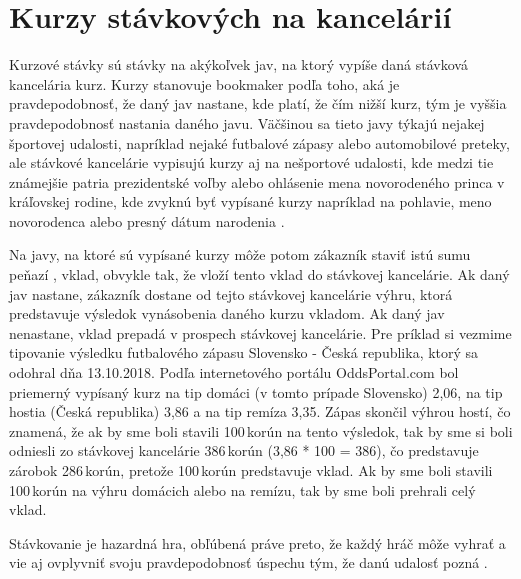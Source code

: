 \section{Kurzy stávkových na kancelárií}
Kurzové stávky sú stávky na akýkoľvek jav, na ktorý vypíše daná stávková kancelária kurz. 
Kurzy stanovuje bookmaker podľa toho, aká je pravdepodobnosť, že daný jav nastane, kde platí, že čím nižší kurz, tým je vyššia pravdepodobnosť nastania daného javu. 
Väčšinou sa tieto javy týkajú nejakej športovej udalosti, napríklad nejaké futbalové zápasy alebo automobilové preteky, ale stávkové kancelárie vypisujú kurzy aj na nešportové udalosti, kde medzi tie známejšie patria prezidentské voľby \citep{bet:pres} alebo ohlásenie mena novorodeného princa v kráľovskej rodine, kde zvyknú byť vypísané kurzy napríklad na pohlavie, meno novorodenca alebo presný dátum narodenia \citep{bet:prince}.

Na javy, na ktoré sú vypísané kurzy môže potom zákazník staviť istú sumu peňazí , vklad, obvykle tak, že vloží tento vklad do stávkovej kancelárie. 
Ak daný jav nastane, zákazník dostane od tejto stávkovej kancelárie výhru, ktorá predstavuje výsledok vynásobenia daného kurzu vkladom.
Ak daný jav nenastane, vklad prepadá v prospech stávkovej kancelárie.
Pre príklad si vezmime tipovanie výsledku futbalového zápasu Slovensko - Česká republika, ktorý sa odohral dňa 13.10.2018. 
Podľa internetového portálu OddsPortal.com bol priemerný vypísaný kurz na tip domáci (v tomto prípade Slovensko) 2,06, na tip hostia (Česká republika) 3,86 a na tip remíza 3,35.
Zápas skončil výhrou hostí, čo znamená, že ak by sme boli stavili 100\,\rm korún na tento výsledok, tak by sme si boli odniesli zo stávkovej kancelárie 386\,\rm korún  (3,86 * 100 = 386), čo predstavuje zárobok 286\,\rm korún, pretože 100\,\rm korún predstavuje vklad.
Ak by sme boli stavili 100\,\rm korún na výhru domácich alebo na remízu, tak by sme boli prehrali celý vklad.

Stávkovanie je hazardná hra, obľúbená práve preto, že každý hráč môže vyhrať a vie aj ovplyvniť svoju pravdepodobnosť úspechu tým, že danú udalosť pozná \citep{odds}.







